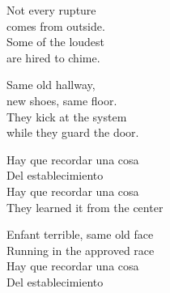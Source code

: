 \begin{lyrics}
Not every rupture\\
comes from outside.\\
Some of the loudest\\
are hired to chime.

Same old hallway,\\
new shoes, same floor.\\
They kick at the system\\
while they guard the door.

Hay que recordar una cosa\\
Del establecimiento\\
Hay que recordar una cosa\\
They learned it from the center

Enfant terrible, same old face\\
Running in the approved race\\
Hay que recordar una cosa\\
Del establecimiento
\end{lyrics}

